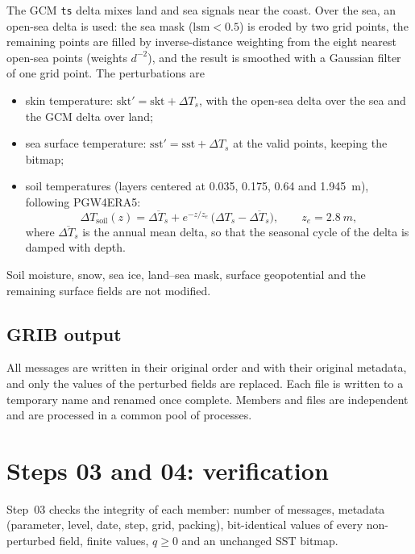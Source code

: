 \documentclass[11pt,a4paper]{article}
\newcommand{\code}[1]{\texttt{#1}}
\begin{document}
The GCM \code{ts} delta mixes land and sea signals near the coast. Over the
sea, an open-sea delta is used: the sea mask ($\mathrm{lsm} < 0.5$) is
eroded by two grid points, the remaining points are filled by
inverse-distance weighting from the eight nearest open-sea points (weights
$d^{-2}$), and the result is smoothed with a Gaussian filter of one grid
point. The perturbations are
\begin{itemize}
  \item skin temperature: $\mathrm{skt}' = \mathrm{skt} + \Delta T_s$, with
    the open-sea delta over the sea and the GCM delta over land;
  \item sea surface temperature: $\mathrm{sst}' = \mathrm{sst} + \Delta T_s$
    at the valid points, keeping the bitmap;
  \item soil temperatures (layers centered at 0.035, 0.175, 0.64 and
    \SI{1.945}{m}), following PGW4ERA5:
    \begin{equation}
      \Delta T_{\mathrm{soil}}(z) = \overline{\Delta T_s} + e^{-z/z_e}\,\bigl(\Delta T_s - \overline{\Delta T_s}\bigr),
      \qquad z_e = \SI{2.8}{m},
    \end{equation}
    where $\overline{\Delta T_s}$ is the annual mean delta, so that the
    seasonal cycle of the delta is damped with depth.
\end{itemize}
Soil moisture, snow, sea ice, land--sea mask, surface geopotential and the
remaining surface fields are not modified.

\subsection{GRIB output}

All messages are written in their original order and with their original
metadata, and only the values of the perturbed fields are replaced. Each file
is written to a temporary name and renamed once complete. Members and files
are independent and are processed in a common pool of processes.

\section{Steps 03 and 04: verification}
\label{sec:verif}

Step~03 checks the integrity of each member: number of messages, metadata
(parameter, level, date, step, grid, packing), bit-identical values of every
non-perturbed field, finite values, $q \ge 0$ and an unchanged SST bitmap.
\end{document}

